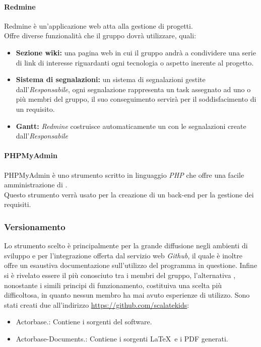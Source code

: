 \documentclass{scalatekids-article}
\begin{document}
\paragraph{Redmine}
Redmine è un'applicazione web atta alla gestione di progetti.\\
Offre diverse funzionalità che il gruppo dovrà utilizzare, quali:
\begin{itemize}
\item\textbf{Sezione wiki:} una pagina web in cui il gruppo andrà a condividere una serie di link di interesse riguardanti ogni tecnologia o aspetto inerente al progetto.
\item\textbf{Sistema di segnalazioni:} un sistema di segnalazioni gestite dall'\textit{Responsabile}, ogni segnalazione rappresenta un task assegnato ad uno o più membri del gruppo, il suo conseguimento servirà per il soddisfacimento di un requisito.
\item\textbf{Gantt:} \textit{Redmine} costruisce automaticamente un  con le segnalazioni create dall'\textit{Responsabile}
\end{itemize}

\paragraph{PHPMyAdmin}
PHPMyAdmin è uno strumento scritto in linguaggio \textit{PHP} che offre una facile amministrazione di .\\
Questo strumento verrà usato per la creazione di un back-end per la gestione dei requisiti.	%

\subsubsection{Versionamento}
Lo strumento scelto è  principalmente per la grande diffusione negli
ambienti di sviluppo e per l'integrazione offerta dal servizio web
\textit{Github}, il quale è inoltre offre un esaustiva documentazione
sull'utilizzo del programma in questione. Infine  si è rivelato essere
il più conosciuto tra i membri del gruppo, l'alternativa , nonostante
i simili principi di funzionamento, costituiva una scelta più difficoltosa, in
quanto nessun membro ha mai avuto esperienze di utilizzo.
Sono stati creati due  all'indirizzo \url{https://github.com/scalatekids}:
\begin{itemize}
\item Actorbase.: Contiene i sorgenti del software.
\item Actorbase-Documents.: Contiene i sorgenti \LaTeX\ e i PDF generati.
\end{itemize}
\end{document}

